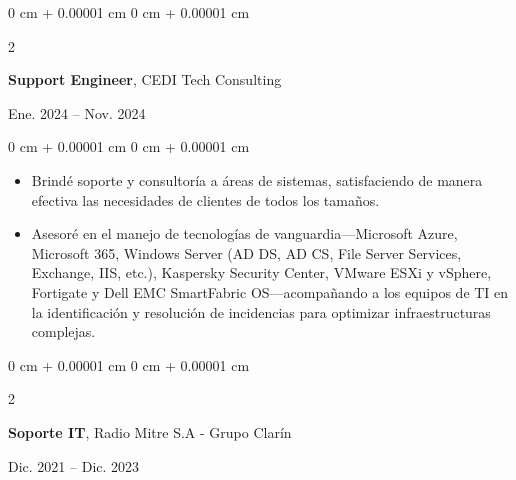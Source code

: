 \documentclass[10pt, letterpaper]{article}
\newenvironment{highlights}{
    \begin{itemize}[
        topsep=0.10 cm,
        parsep=0.10 cm,
        partopsep=0pt,
        itemsep=0pt,
        leftmargin=0 cm + 10pt
    ]
}{
    \end{itemize}
} %
\newenvironment{onecolentry}{
    \begin{adjustwidth}{
        0 cm + 0.00001 cm
    }{
        0 cm + 0.00001 cm
    }
}{
    \end{adjustwidth}
} %
\newenvironment{twocolentry}[2][]{
    \onecolentry
    \def\secondColumn{#2}
    \setcolumnwidth{\fill, 4.5 cm}
    \begin{paracol}{2}
}{
    \switchcolumn \raggedleft \secondColumn
    \end{paracol}
    \endonecolentry
} %
\begin{document}
\vspace{0.2 cm}   

\begin{twocolentry}{
    Ene. 2024 – Nov. 2024
}
    \textbf{Support Engineer}, CEDI Tech Consulting
\end{twocolentry}

\vspace{0.10 cm}
\begin{onecolentry}
    \begin{highlights}
        \item Brindé soporte y consultoría a áreas de sistemas, satisfaciendo de manera efectiva las necesidades de clientes de todos los tamaños.
        \item Asesoré en el manejo de tecnologías de vanguardia—Microsoft Azure, Microsoft 365, Windows Server (AD DS, AD CS, File Server Services, Exchange, IIS, etc.), Kaspersky Security Center, VMware ESXi y vSphere, Fortigate y Dell EMC SmartFabric OS—acompañando a los equipos de TI en la identificación y resolución de incidencias para optimizar infraestructuras complejas.
    \end{highlights}
\end{onecolentry}

\vspace{0.2 cm}

\begin{twocolentry}{
    Dic. 2021 – Dic. 2023
}
    \textbf{Soporte IT}, Radio Mitre S.A - Grupo Clarín
\end{twocolentry}
\end{document}
